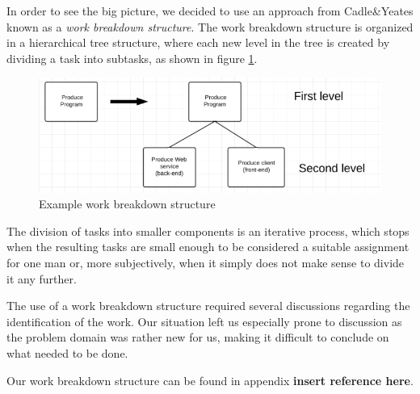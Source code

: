 In order to see the big picture, we decided to use an approach from Cadle\&Yeates\cite{caye} known as a \emph{work breakdown structure}. The work breakdown structure is organized in a hierarchical tree structure, where each new level in the tree is created by dividing a task into subtasks, as shown in figure \ref{fig:breakdown}.

\begin{figure}[hbtp]
	\includegraphics[scale=0.5]{./Empiri/Planning/img/wbslevels.png}
	\caption{Example work breakdown structure} \label{fig:breakdown}
\end{figure}

The division of tasks into smaller components is an iterative process, which stops when the resulting tasks are small enough to be considered a suitable assignment for one man or, more subjectively, when it simply does not make sense to divide it any further.

The use of a work breakdown structure required several discussions regarding the identification
of the work. Our situation left us especially prone to discussion as the problem domain was rather
new for us, making it difficult to conclude on what needed to be done.

Our work breakdown structure can be found in appendix \textbf{insert reference here}.